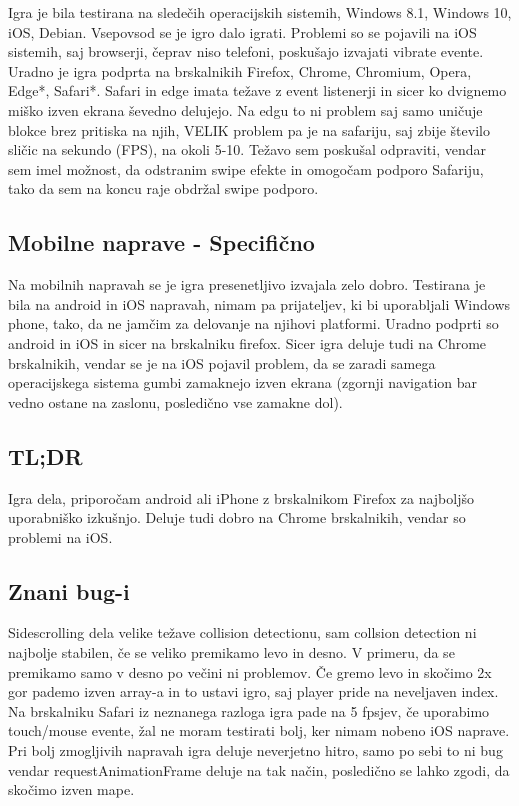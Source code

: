 \documentclass[a4paper,11pt]{article}
\begin{document}
Igra je bila testirana na sledečih operacijskih sistemih, Windows 8.1, Windows 10, iOS, Debian. Vsepovsod se je igro dalo igrati. Problemi so se pojavili na iOS sistemih, saj browserji, čeprav niso telefoni, poskušajo izvajati vibrate evente. Uradno je igra podprta na brskalnikih Firefox, Chrome, Chromium, Opera, Edge*, Safari*. Safari in edge imata težave z event listenerji in sicer ko dvignemo miško izven ekrana ševedno delujejo. Na edgu to ni problem saj samo uničuje blokce brez pritiska na njih, VELIK problem pa je na safariju, saj zbije število sličic na sekundo (FPS), na okoli 5-10. Težavo sem poskušal odpraviti, vendar sem imel možnost, da odstranim swipe efekte in omogočam podporo Safariju, tako da sem na koncu raje obdržal swipe podporo.

\subsection{Mobilne naprave - Specifično}

Na mobilnih napravah se je igra presenetljivo izvajala zelo dobro. Testirana je bila na android in iOS napravah, nimam pa prijateljev, ki bi uporabljali Windows phone, tako, da ne jamčim za delovanje na njihovi platformi. Uradno podprti so android in iOS in sicer na brskalniku firefox. Sicer igra deluje tudi na Chrome brskalnikih, vendar se je na iOS pojavil problem, da se zaradi samega operacijskega sistema gumbi zamaknejo izven ekrana (zgornji navigation bar vedno ostane na zaslonu, posledično vse zamakne dol).

\subsection{TL;DR}

Igra dela, priporočam android ali iPhone z brskalnikom Firefox za najboljšo uporabniško izkušnjo. Deluje tudi dobro na Chrome brskalnikih, vendar so problemi na iOS.

\subsection{Znani bug-i}

Sidescrolling dela velike težave collision detectionu, sam collsion detection ni najbolje stabilen, če se veliko premikamo levo in desno. V primeru, da se premikamo samo v desno po večini ni problemov. Če gremo levo in skočimo 2x gor pademo izven array-a in to ustavi igro, saj player pride na neveljaven index. Na brskalniku Safari iz neznanega razloga igra pade na 5 fpsjev, če uporabimo touch/mouse evente, žal ne moram testirati bolj, ker nimam nobeno iOS naprave. Pri bolj zmogljivih napravah igra deluje neverjetno hitro, samo po sebi to ni bug vendar requestAnimationFrame deluje na tak način, posledično se lahko zgodi, da skočimo izven mape.
\end{document}
